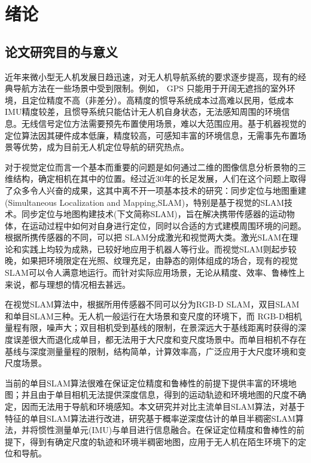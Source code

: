 
\chapter{绪论}
\label{chap:intro}

\section{论文研究目的与意义}
近年来微小型无人机发展日趋迅速，对无人机导航系统的要求逐步提高，现有的经典导航方法在一些场景中受到限制。例如， GPS 只能用于开阔无遮挡的室外环境，且定位精度不高（非差分）。高精度的惯导系统成本过高难以民用，低成本IMU精度较差，且惯导系统只能估计无人机自身状态，无法感知周围的环境信息。无线信号定位方法需要预先布置使用场景，难以大范围应用。基于机器视觉的定位算法因其硬件成本低廉，精度较高，可感知丰富的环境信息，无需事先布置场景等优势，成为目前无人机定位导航的研究热点。

对于视觉定位而言一个基本而重要的问题是如何通过二维的图像信息分析景物的三维结构，确定相机在其中的位置\upcite{[1.1]}。经过近30年的长足发展，人们在这个问题上取得了众多令人兴奋的成果，这其中离不开一项基本技术的研究：同步定位与地图重建(Simultaneous Localization and Mapping,SLAM)，特别是基于视觉的SLAM技术。同步定位与地图构建技术(下文简称SLAM)，旨在解决携带传感器的运动物体，在运动过程中如何对自身进行定位，同时以合适的方式建模周围环境的问题。根据所携传感器的不同，可以把 SLAM分成激光和视觉两大类。激光SLAM在理论和实践上均较为成熟，已较好地应用于机器人等行业。而视觉SLAM则起步较晚，如果把环境限定在光照、纹理充足，由静态的刚体组成的场合，现有的视觉SLAM可以令人满意地运行。而针对实际应用场景，无论从精度、效率、鲁棒性上来说，都与理想的情况相去甚远。

在视觉SLAM算法中，根据所用传感器不同可以分为RGB-D SLAM，双目SLAM和单目SLAM三种\upcite{[1.2]}。无人机一般运行在大场景和变尺度的环境下，而 RGB-D相机量程有限，噪声大；双目相机受到基线的限制，在景深远大于基线距离时获得的深度误差很大而退化成单目，都无法用于大尺度和变尺度场景中。而单目相机不存在基线与深度测量量程的限制，结构简单，计算效率高，广泛应用于大尺度环境和变尺度场景。

当前的单目SLAM算法很难在保证定位精度和鲁棒性的前提下提供丰富的环境地图；并且由于单目相机无法提供深度信息，得到的运动轨迹和环境地图的尺度不确定，因而无法用于导航和环境感知。本文研究并对比主流单目SLAM算法，对基于特征的单目SLAM算法进行改进，研究基于概率逆深度估计的单目半稠密SLAM算法，并将惯性测量单元(IMU)与单目进行信息融合。在保证定位精度和鲁棒性的前提下，得到有确定尺度的轨迹和环境半稠密地图，应用于无人机在陌生环境下的定位和导航。
